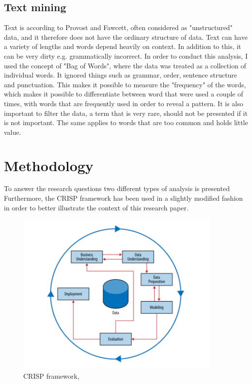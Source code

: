 \documentclass[12pt]{article}
\begin{document}
\subsection{Text mining}
Text is according to Provost and Fawcett, often considered as "unstructured" data, and it therefore does not have the ordinary structure of data. Text can have a variety of lengths and words depend heavily on context. In addition to this, it can be very dirty e.g. grammatically incorrect. In order to conduct this analysis, I used the concept of "Bag of Words", where the data was treated as a collection of individual words. It ignored things such as grammar, order, sentence structure and punctuation. This makes it possible to measure the "frequency" of the words, which makes it possible to differentiate between word that were used a couple of times, with words that are frequently used in order to reveal a pattern. It is also important to filter the data, a term that is very rare, should not be presented if it is not important. The same applies to words that are too common and holds little value. \citep{foster}




\section{Methodology}
To answer the research questions two different types of analysis is presented\\


Furthermore,  the CRISP framework has been used in a slightly modified fashion in order to better illustrate the context of this research paper.\\

\begin{figure}[H] %
	\centering %
\includegraphics [scale= .95]  {CRISP.PNG}    %
	\caption[Optional caption] {CRISP framework, \citep{foster}}
	\label{fig:wordcloudBliz}

\end{figure}
\end{document}
